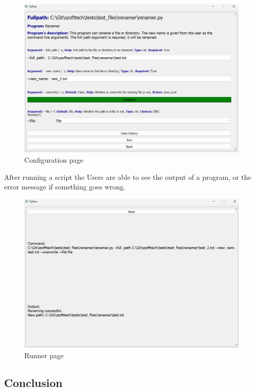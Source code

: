 \documentclass{article}
\begin{document}
\begin{figure}[h]
    \centering
    \includegraphics[width=1\linewidth]{img/config_page.png}
    \caption{Configuration page}
    \label{fig:enter-label}
\end{figure}

\clearpage

After running a script the Users are able to see the output of a program, or the error message if something goes wrong.

\begin{figure}[h]
    \centering
    \includegraphics[width=1\linewidth]{img/runner_page.png}
    \caption{Runner page}
    \label{fig:enter-label}
\end{figure}

\subsection{Conclusion}
\end{document}
